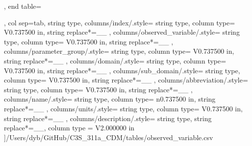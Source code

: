 \begin{landscape}
\begin{longtable}
{{            \endlastfoot
        }
    },
    end table=\end{longtable},
    col sep=tab,
    string type,
    columns/index/.style={
            string type, 
            column type= V{0.737500 in}, 
            string replace*={_}{\_}
        },
    columns/observed_variable/.style={
            string type, 
            column type= V{0.737500 in}, 
            string replace*={_}{\_}
        },
    columns/parameter_group/.style={
            string type, 
            column type= V{0.737500 in}, 
            string replace*={_}{\_}
        },
    columns/domain/.style={
            string type, 
            column type= V{0.737500 in}, 
            string replace*={_}{\_}
        },
    columns/sub_domain/.style={
            string type, 
            column type= V{0.737500 in}, 
            string replace*={_}{\_}
        },
    columns/abbreviation/.style={
            string type, 
            column type= V{0.737500 in}, 
            string replace*={_}{\_}
        },
    columns/name/.style={
            string type, 
            column type= n{0.737500 in}, 
            string replace*={_}{\_}
        },
    columns/units/.style={
            string type, 
            column type= V{0.737500 in}, 
            string replace*={_}{\_}
        },
    columns/description/.style={
            string type, 
            string replace*={_}{\_},
            column type = V{2.000000 in}
        }
    ]{/Users/dyb/GitHub/C3S_311a_CDM/tables/observed_variable.csv}
\end{landscape}
